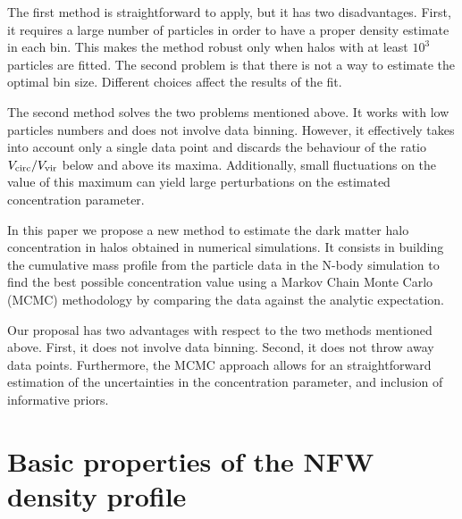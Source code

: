 \documentclass{emulateapj}
\begin{document}
The first method is straightforward to apply, but it has two
disadvantages.
First, it requires a large number of particles in
order to have a proper density estimate in each bin.
This makes the method robust only when halos with at least  $10^3$
particles are fitted.
The second problem is that there is not a way to estimate the optimal
bin size.
Different choices affect the results of the fit.

The second method solves the two problems mentioned above.
It works with low particles numbers and does not involve data
binning.
However, it effectively takes into account only a single data point
and discards the behaviour of the ratio $V_{\rm circ}/V_{\rm vir}$ below and
above its maxima.
Additionally, small fluctuations on the value of this maximum can
yield large perturbations on the estimated concentration parameter.

In this paper we propose a new method to estimate the dark matter halo
concentration in halos obtained in numerical simulations.
It consists in building the cumulative mass profile from the
particle data in the N-body simulation to find the best possible
concentration value using a Markov Chain Monte Carlo (MCMC)
methodology by comparing the data against the analytic expectation.

Our proposal has two advantages with respect to the two methods mentioned
above.
First, it does not involve data binning.
Second, it does not throw away data points.
Furthermore, the MCMC approach allows for an straightforward
estimation of the uncertainties in the concentration parameter, and
inclusion of informative priors.


\section{Basic properties of the NFW density profile}
\label{sec:basics}
\end{document}

